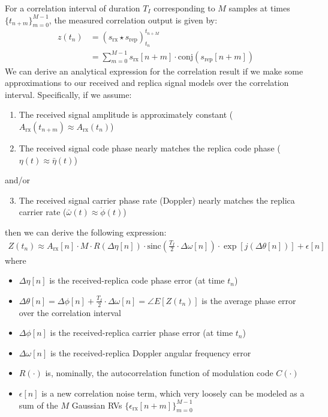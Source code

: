 \documentclass{article}
\begin{document}
For a correlation interval of duration $T_I$ corresponding to $M$ samples at times $\{t_{n+m}\}_{m=0}^{M-1}$, the measured correlation output is given by:
%
\begin{align*}
z(t_n) &= \left( s_\text{rx} \star s_\text{rep}\right)_{t_n}^{t_{n+M}}  \\
 &= \sum_{m=0}^{M-1} s_\text{rx}[n+m] \cdot \text{conj}\left(s_\text{rep}[n+m]\right)
\end{align*}
%
We can derive an analytical expression for the correlation result if we make some approximations to our received and replica signal models over the correlation interval.  Specifically, if we assume:
%
\begin{enumerate}
    \item The received signal amplitude is approximately constant ($A_\text{rx}(t_{n+m}) \approx A_\text{rx}(t_n)$)
    \item The received signal code phase nearly matches the replica code phase ($\eta(t)\approx \bar{\eta}(t)$)
\end{enumerate}
%
and/or
%
\begin{enumerate}
    \setcounter{enumi}{2}
    \item The received signal carrier phase rate (Doppler) nearly matches the replica carrier rate ($\bar{\omega}(t)\approx\dot{\phi}(t)$)
\end{enumerate}
%
then we can derive the following expression:
%
\begin{align}
    Z(t_n) \approx A_\text{rx}[n] \cdot M \cdot R(\Delta\eta[n])\cdot \text{sinc} \left( \frac{T_I}{2}\cdot\Delta \omega[n] \right) \cdot \exp\left[ j \left(\Delta \theta[n] \right) \right] + \epsilon[n] \label{eqn:correlation}
\end{align}
%
where
%
\begin{itemize}
    \item $\Delta\eta[n]$ is the received-replica code phase error (at time $t_n$)
    \item $\Delta\theta[n] = \Delta \phi[n] + \frac{T_I}{2}\cdot \Delta\omega[n] = \angle E[Z(t_n)] $ is the average phase error over the correlation interval
    \item $\Delta\phi[n]$ is the received-replica carrier phase error (at time $t_n$)
    \item $\Delta\omega[n]$ is the received-replica Doppler angular frequency error
    \item $R(\cdot)$ is, nominally, the autocorrelation function of modulation code $C(\cdot)$
    \item $\epsilon[n]$ is a new correlation noise term, which very loosely can be modeled as a sum of the $M$ Gaussian RVs $\{\epsilon_\text{rx}[n+m]\}_{m=0}^{M-1}$
\end{itemize}
\end{document}
